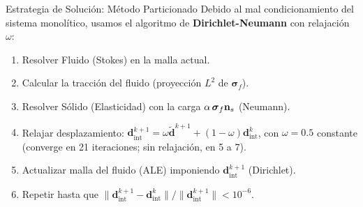 \begin{frame}[allowframebreaks]{Estrategia de Solución: Método Particionado}
    Debido al mal condicionamiento del sistema monolítico, usamos el algoritmo de \textbf{Dirichlet-Neumann} con relajación $\omega$:
    
    \vspace{0.3cm}
    \begin{enumerate}
        \item Resolver Fluido (Stokes) en la malla actual.
        \item Calcular la tracción del fluido (proyección $L^2$ de $\boldsymbol{\sigma}_f$).
        \item Resolver Sólido (Elasticidad) con la carga $\alpha\,\boldsymbol{\sigma}_f\mathbf{n}_s$ (Neumann).
        \item Relajar desplazamiento: $\mathbf{d}_{\text{int}}^{k+1} = \omega \tilde{\mathbf{d}}^{k+1} + (1-\omega) \mathbf{d}_{\text{int}}^k$, con $\omega = 0.5$ constante (converge en 21 iteraciones; sin relajación, en 5 a 7).
        \item Actualizar malla del fluido (ALE) imponiendo $\mathbf{d}_{\text{int}}^{k+1}$ (Dirichlet).
        \item Repetir hasta que $\|\mathbf{d}_{\text{int}}^{k+1} - \mathbf{d}_{\text{int}}^k\| / \|\mathbf{d}_{\text{int}}^{k+1}\| < 10^{-6}$.
    \end{enumerate}
\end{frame}


